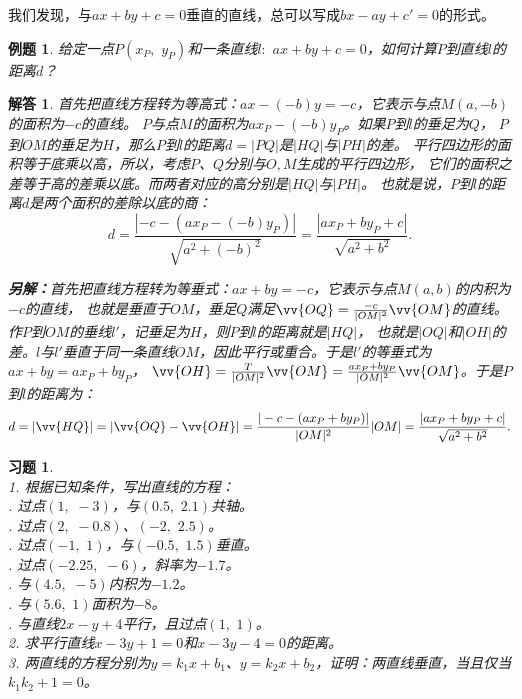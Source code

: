 \documentclass[12pt,UTF8]{ctexbook}
\newtheorem{et}{例题}[section]
\newtheorem*{so}{解答}
\newtheorem{xt}{习题}[section]
\begin{document}
我们发现，与$ax + by + c = 0$垂直的直线，总可以写成$bx - ay + c' = 0$的形式。

\begin{et}
    给定一点$P(x_P, \,\,y_P)$和一条直线$l: \,\, ax + by + c = 0$，如何计算$P$到直线$l$的距离$d$？
\end{et}
\begin{so}
    首先把直线方程转为等高式：$ax - (-b)y = -c$，它表示与点$M(a, -b)$的面积为$-c$的直线。
$P$与点$M$的面积为$ax_P - (-b)y_P$。如果$P$到$l$的垂足为$Q$，
$P$到$OM$的垂足为$H$，那么$P$到$l$的距离$d = |PQ|$是$|HQ|$与$|PH|$的差。
平行四边形的面积等于底乘以高，所以，考虑$P$、$Q$分别与$O, M$生成的平行四边形，
它们的面积之差等于高的差乘以底。而两者对应的高分别是$|HQ|$与$|PH|$。
也就是说，$P$到$l$的距离$d$是两个面积的差除以底的商：
$$ d = \frac{|-c - (ax_P - (-b)y_P)|}{\sqrt{a^2 + (-b)^2}} = \frac{|ax_P + by_P + c|}{\sqrt{a^2 + b^2}}.$$

\textbf{另解：}首先把直线方程转为等垂式：$ax + by = -c$，它表示与点$M(a, b)$的内积为$-c$的直线，
也就是垂直于$OM$，垂足$Q$满足$\vv{OQ} = \frac{-c}{|OM|^2}\vv{OM}$的直线。作$P$到$OM$的垂线$l'$，记垂足为$H$，则$P$到$l$的距离就是$|HQ|$，
也就是$|OQ|$和$|OH|$的差。$l$与$l'$垂直于同一条直线$OM$，因此平行或重合。于是$l'$的等垂式为$ax + by = ax_P + by_P$，
$\vv{OH} = \frac{T}{|OM|^2}\vv{OM} = \frac{ax_P + by_P}{|OM|^2}\vv{OM}$。于是$P$到$l$的距离为：
$$ d = |\vv{HQ}| = |\vv{OQ} - \vv{OH}| = \frac{|-c - (ax_P + by_P)|}{|OM|^2} |OM| = \frac{|ax_P + by_P + c|}{\sqrt{a^2 + b^2}}. $$
\end{so}

\begin{xt}
    \mbox{}\\
    1. 根据已知条件，写出直线的方程：\\
    . 过点$(1, \,\,-3)$，与$(0.5, \,\,2.1)$共轴。\\
    . 过点$(2, \,\,-0.8)$、$(-2, \,\,2.5)$。\\
    . 过点$(-1, \,\,1)$，与$(-0.5, \,\,1.5)$垂直。\\
    . 过点$(-2.25, \,\,-6)$，斜率为$-1.7$。\\
    . 与$(4.5,\,\, -5)$内积为$-1.2$。\\
    . 与$(5.6, \,\,1)$面积为$-8$。\\
    . 与直线$2x - y + 4$平行，且过点$(1, \,\, 1)$。 \\
    2. 求平行直线$x - 3y + 1 = 0$和$x - 3y - 4 = 0$的距离。 \\
    3. 两直线的方程分别为$y = k_1 x + b_1$、$y = k_2 x + b_2$，证明：两直线垂直，当且仅当$k_1k_2 + 1 = 0$。
\end{xt}
\end{document}
